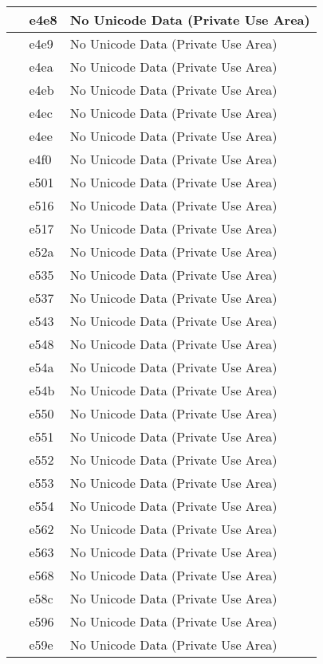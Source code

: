 \documentclass[12pt,letterpaper,openany]{book}
\begin{document}
\begin{center}
\begin{supertabular}{|m{0.25in}|m{0.5in}|m{4in}|}
 & e4e8 & No Unicode Data (Private Use Area)\\\hline
 & e4e9 & No Unicode Data (Private Use Area)\\\hline
 & e4ea & No Unicode Data (Private Use Area)\\\hline
 & e4eb & No Unicode Data (Private Use Area)\\\hline
 & e4ec & No Unicode Data (Private Use Area)\\\hline
 & e4ee & No Unicode Data (Private Use Area)\\\hline
 & e4f0 & No Unicode Data (Private Use Area)\\\hline
 & e501 & No Unicode Data (Private Use Area)\\\hline
 & e516 & No Unicode Data (Private Use Area)\\\hline
 & e517 & No Unicode Data (Private Use Area)\\\hline
 & e52a & No Unicode Data (Private Use Area)\\\hline
 & e535 & No Unicode Data (Private Use Area)\\\hline
 & e537 & No Unicode Data (Private Use Area)\\\hline
 & e543 & No Unicode Data (Private Use Area)\\\hline
 & e548 & No Unicode Data (Private Use Area)\\\hline
 & e54a & No Unicode Data (Private Use Area)\\\hline
 & e54b & No Unicode Data (Private Use Area)\\\hline
 & e550 & No Unicode Data (Private Use Area)\\\hline
 & e551 & No Unicode Data (Private Use Area)\\\hline
 & e552 & No Unicode Data (Private Use Area)\\\hline
 & e553 & No Unicode Data (Private Use Area)\\\hline
 & e554 & No Unicode Data (Private Use Area)\\\hline
 & e562 & No Unicode Data (Private Use Area)\\\hline
 & e563 & No Unicode Data (Private Use Area)\\\hline
 & e568 & No Unicode Data (Private Use Area)\\\hline
 & e58c & No Unicode Data (Private Use Area)\\\hline
 & e596 & No Unicode Data (Private Use Area)\\\hline
 & e59e & No Unicode Data (Private Use Area)\\\hline

\end{supertabular}
\end{center}
\end{document}
